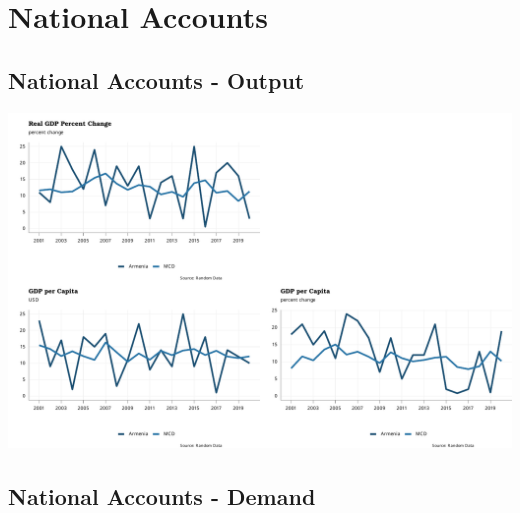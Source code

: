 \documentclass[
]{article}
\begin{document}
\hypertarget{national-accounts}{%
\section{National Accounts}\label{national-accounts}}

\hypertarget{national-accounts---output}{%
\subsection{National Accounts -
Output}\label{national-accounts---output}}

\begin{center}\includegraphics{RandomData_MCD__files/figure-latex/ouput-1} \end{center}
\newpage

\hypertarget{national-accounts---demand}{%
\subsection{National Accounts -
Demand}\label{national-accounts---demand}}
\end{document}

